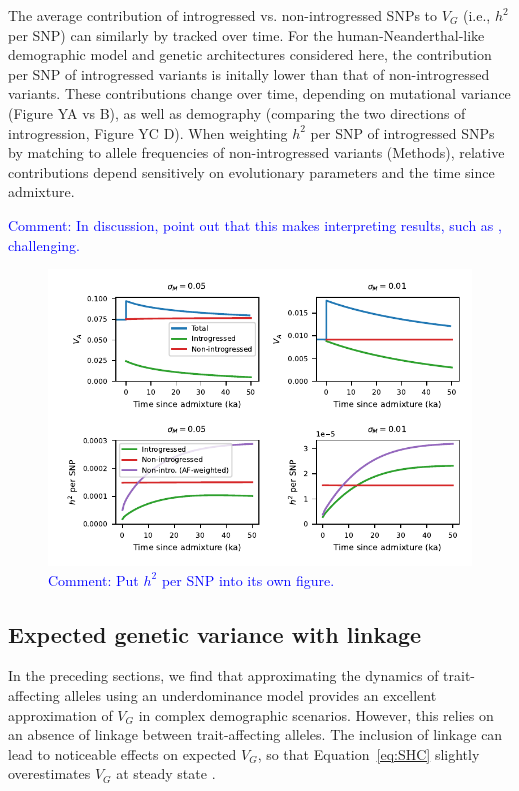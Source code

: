 \documentclass{article}
\newcommand{\aprcomment}[1]{{\textcolor{blue}{Comment: #1}}}
\begin{document}
The average contribution of introgressed vs. non-introgressed SNPs to $V_G$
(i.e., $h^2$ per SNP) can similarly by tracked over time. For the
human-Neanderthal-like demographic model and genetic architectures considered
here, the contribution per SNP of introgressed variants is initally lower than
that of non-introgressed variants. These contributions change over time,
depending on mutational variance (Figure YA vs B), as well as demography
(comparing the two directions of introgression, Figure YC D). When weighting
$h^2$ per SNP of introgressed SNPs by matching to allele frequencies of
non-introgressed variants (Methods), relative contributions depend sensitively
on evolutionary parameters and the time since admixture.

\aprcomment{In discussion, point out that this makes interpreting results, such
as \cite{wei2023lingering}, challenging.}

\begin{figure}[t!]
    \centering
    \includegraphics{../figures/human_admixture.pdf}
    \caption{
        \textbf{}
        \aprcomment{Put $h^2$ per SNP into its own figure.}
    }
    \label{fig:human-to-neand}
\end{figure}

\subsection*{Expected genetic variance with linkage}

In the preceding sections, we find that approximating the dynamics of
trait-affecting alleles using an underdominance model
\citep{robertson1956effect} provides an excellent approximation of $V_G$ in
complex demographic scenarios. However, this relies on an absence of linkage
between trait-affecting alleles. The inclusion of linkage can lead to
noticeable effects on expected $V_G$, so that Equation~\ref{eq:SHC} slightly
overestimates $V_G$ at steady state
\citep{burger1989much,burger1994distribution,walsh2018evolution}.
\end{document}
